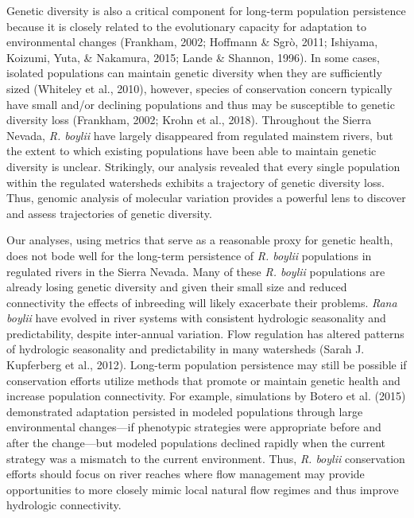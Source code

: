 \documentclass[proquest,12pt,final]{ucthesis-CA2012} %
\begin{document}
\begin{ucmainmatter}
Genetic diversity is also a critical component for long-term population
persistence because it is closely related to the evolutionary capacity
for adaptation to environmental changes (Frankham, 2002; Hoffmann \&
Sgrò, 2011; Ishiyama, Koizumi, Yuta, \& Nakamura, 2015; Lande \&
Shannon, 1996). In some cases, isolated populations can maintain genetic
diversity when they are sufficiently sized (Whiteley et al., 2010),
however, species of conservation concern typically have small and/or
declining populations and thus may be susceptible to genetic diversity
loss (Frankham, 2002; Krohn et al., 2018). Throughout the Sierra Nevada,
\emph{R. boylii} have largely disappeared from regulated mainstem
rivers, but the extent to which existing populations have been able to
maintain genetic diversity is unclear. Strikingly, our analysis revealed
that every single population within the regulated watersheds exhibits a
trajectory of genetic diversity loss. Thus, genomic analysis of
molecular variation provides a powerful lens to discover and assess
trajectories of genetic diversity.

Our analyses, using metrics that serve as a reasonable proxy for genetic
health, does not bode well for the long-term persistence of \emph{R.
boylii} populations in regulated rivers in the Sierra Nevada. Many of
these \emph{R. boylii} populations are already losing genetic diversity
and given their small size and reduced connectivity the effects of
inbreeding will likely exacerbate their problems. \emph{Rana boylii}
have evolved in river systems with consistent hydrologic seasonality and
predictability, despite inter-annual variation. Flow regulation has
altered patterns of hydrologic seasonality and predictability in many
watersheds (Sarah J. Kupferberg et al., 2012). Long-term population
persistence may still be possible if conservation efforts utilize
methods that promote or maintain genetic health and increase population
connectivity. For example, simulations by Botero et al. (2015)
demonstrated adaptation persisted in modeled populations through large
environmental changes---if phenotypic strategies were appropriate before
and after the change---but modeled populations declined rapidly when the
current strategy was a mismatch to the current environment. Thus,
\emph{R. boylii} conservation efforts should focus on river reaches
where flow management may provide opportunities to more closely mimic
local natural flow regimes and thus improve hydrologic connectivity.


\end{ucmainmatter}
\end{document}
